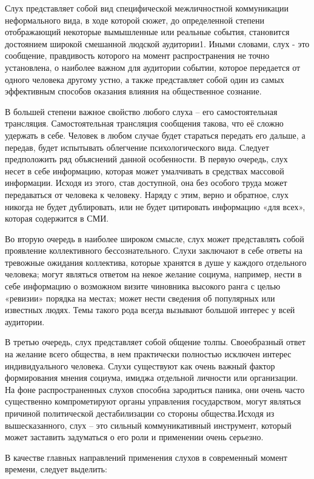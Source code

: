 \documentclass[a4paper,14pt,russian]{report}
\begin{document}
Слух представляет собой вид специфической межличностной коммуникации неформального вида, в ходе которой сюжет, до определенной степени отображающий некоторые вымышленные или реальные события, становится достоянием широкой смешанной людской аудитории1. Иными словами, слух - это сообщение, правдивость которого на момент распространения не точно установлена, о наиболее важном для аудитории событии, которое передается от одного человека другому устно, а также представляет собой один из самых эффективным способов оказания влияния на общественное сознание.

В большей степени важное свойство любого слуха – его самостоятельная трансляция. Самостоятельная трансляция сообщения такова, что её сложно удержать в себе. Человек в любом случае будет стараться передать его дальше, а передав, будет испытывать облегчение психологического вида.
Следует предположить ряд объяснений данной особенности. В первую очередь, слух несет в себе информацию, которая может умалчивать в средствах массовой информации. Исходя из этого, став доступной, она без особого труда может передаваться от человека к человеку. Наряду с этим, верно и обратное, слух никогда не будет дублировать, или не будет цитировать информацию «для всех», которая содержится в СМИ.

Во вторую очередь в наиболее широком смысле, слух может представлять собой проявление коллективного бессознательного. Слухи заключают в себе ответы на тревожные ожидания коллектива, которые хранятся в душе у каждого отдельного человека; могут являться ответом на некое желание социума, например, нести в себе информацию о возможном визите чиновника высокого ранга с целью «ревизии» порядка на местах; может нести сведения об популярных или известных людях. Темы такого рода всегда вызывают большой интерес у всей аудитории.

В третью очередь, слух представляет собой общение толпы. Своеобразный ответ на желание всего общества, в нем практически полностью исключен интерес индивидуального человека.
Слухи существуют как очень важный фактор формирования мнения социума, имиджа отдельной личности или организации. На фоне распространенных слухов способна зародиться паника, они очень часто существенно компрометируют органы управления государством, могут являться причиной политической дестабилизации со стороны общества.Исходя из вышесказанного, слух – это сильный коммуникативный инструмент, который может заставить задуматься о его роли и применении очень серьезно.

В качестве главных направлений применения слухов в современный момент времени, следует выделить:
\end{document}
